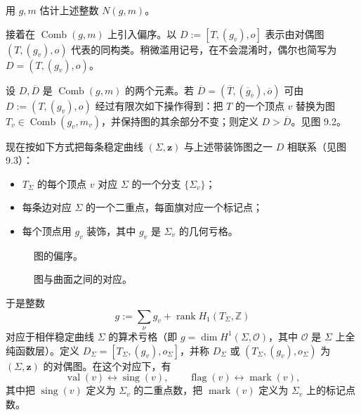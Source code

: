 \begin{exercise}\label{ex:estimate-number-combinatorial-types}
用 $g,m$ 估计上述整数 $N(g,m)$。
\end{exercise}

接着在 $\operatorname{Comb}(g,m)$ 上引入偏序。以
$D:=[T,(g_v),o]$ 表示由对偶图 $(T,(g_v),o)$ 代表的同构类。稍微滥用记号，在不会混淆时，偶尔也简写为 $D=(T,(g_v),o)$。

\begin{definition}\label{def:partial-order-dual-graphs}
设 $D,\overline D$ 是 $\operatorname{Comb}(g,m)$ 的两个元素。若
$\overline D=(\overline T,(\overline g_{\overline v}),\overline o)$ 可由
$D:=(T,(g_v),o)$ 经过有限次如下操作得到：把 $T$ 的一个顶点 $v$ 替换为图
$T_v\in\operatorname{Comb}(g_v,m_v)$，并保持图的其余部分不变；则定义
$D>\overline D$。见图 9.2。
\end{definition}

现在按如下方式把每条稳定曲线 $(\Sigma,\mathbf z)$ 与上述带装饰图之一 $D$ 相联系（见图 9.3）：
\begin{itemize}
 \item $T_\Sigma$ 的每个顶点 $v$ 对应 $\Sigma$ 的一个分支 $\{\Sigma_v\}$；
 \item 每条边对应 $\Sigma$ 的一个二重点，每面旗对应一个标记点；
 \item 每个顶点用 $g_v$ 装饰，其中 $g_v$ 是 $\Sigma_v$ 的几何亏格。
\end{itemize}

\begin{figure}[htbp]
 \centering
 
 \caption{图的偏序。}
 \label{fig:partial-order-graphs}
\end{figure}

\begin{figure}[htbp]
 \centering
 
 \caption{图与曲面之间的对应。}
 \label{fig:graphs-surfaces-correspondence}
\end{figure}

于是整数
\[
 g:=\sum_\nu g_v+\operatorname{rank}H_1(T_\Sigma,\mathbb Z)
\]
对应于相伴稳定曲线 $\Sigma$ 的算术亏格（即
$g=\dim H^1(\Sigma,\mathcal O)$，其中 $\mathcal O$ 是 $\Sigma$ 上全纯函数层）。定义
$D_\Sigma=[T_\Sigma,(g_v),o_\Sigma]$，并称 $D_\Sigma$ 或
$(T_\Sigma,(g_v),o_\Sigma)$ 为 $(\Sigma,\mathbf z)$ 的对偶图。在这个对应下，有
\[
 \operatorname{val}(v)\longleftrightarrow\operatorname{sing}(v),
 \qquad
 \operatorname{flag}(v)\longleftrightarrow\operatorname{mark}(v),
\]
其中把 $\operatorname{sing}(v)$ 定义为 $\Sigma_v$ 的二重点数，把
$\operatorname{mark}(v)$ 定义为 $\Sigma_v$ 上的标记点数。

